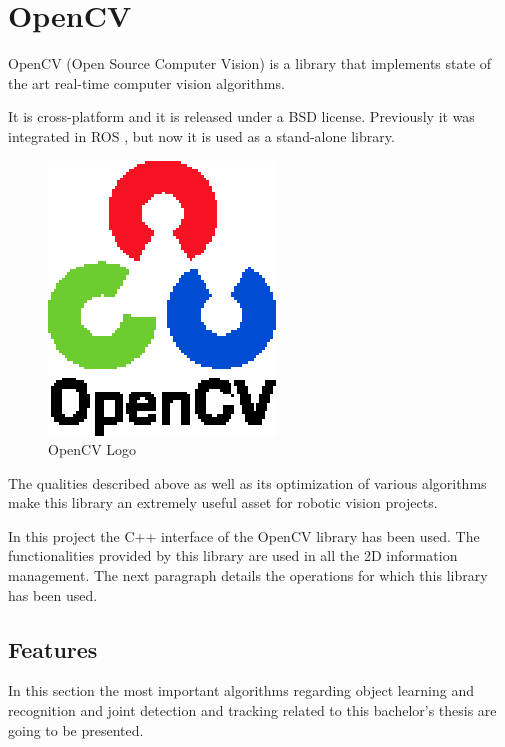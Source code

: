 \section{OpenCV}
\label{opencv}

OpenCV\cite{opencv} (Open Source Computer Vision) is a library that implements state of the art real-time computer vision 
algorithms. 

It is cross-platform and it is released under a BSD\cite{BSD} license. Previously it was integrated in ROS \cite{ros}, but
now it is used as a stand-alone library.  

\begin{figure}[h]
	\begin{center}
    \includegraphics[scale=1]{img/opencv/logo.eps}
	\caption[OpenCV Logo]{OpenCV Logo}
	\end{center}
\end{figure}

The qualities described above as well as its optimization of various algorithms make this library an extremely useful asset for robotic vision projects. 


In this project the C++ interface of the OpenCV library has been used. The functionalities provided by this library are used in all the 2D information management. The next paragraph details the operations for which this library has been used. 


\subsection{Features}
\label{features}
In this section the most important algorithms regarding object learning and recognition and joint detection and tracking related to this bachelor's thesis are going to be presented.


